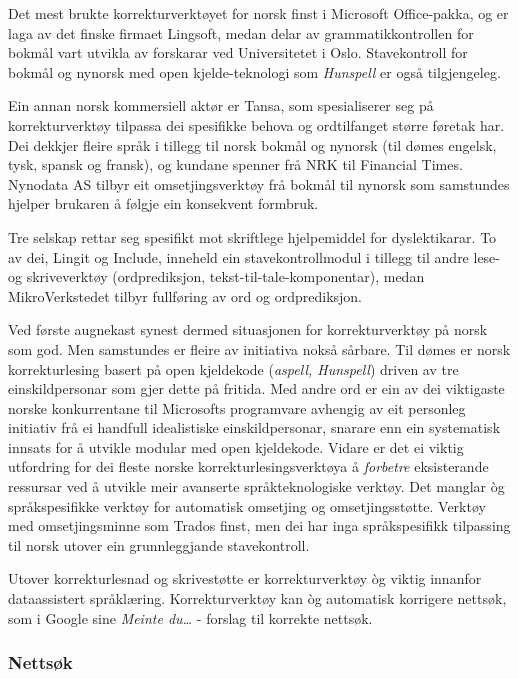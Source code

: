 \begin{multicols}{2}
Det mest brukte korrekturverktøyet for norsk finst i Microsoft Office-pakka, og er laga av det finske firmaet Lingsoft, medan delar av grammatikkontrollen for bokmål vart utvikla av forskarar ved Universitetet i Oslo. Stavekontroll for bokmål og nynorsk med open kjelde-teknologi som \textit{Hunspell} er også tilgjengeleg. 

Ein annan norsk kommersiell aktør er Tansa, som spesialiserer seg på korrekturverktøy tilpassa dei spesifikke behova og ordtilfanget større føretak har. 
Dei dekkjer fleire språk i tillegg til norsk bokmål og nynorsk (til dømes engelsk, tysk, spansk og fransk), og kundane spenner frå NRK til Financial Times. 
Nynodata AS tilbyr eit omsetjingsverktøy frå bokmål til nynorsk som samstundes hjelper brukaren å følgje ein konsekvent formbruk. 

Tre selskap rettar seg spesifikt mot skriftlege hjelpemiddel for dyslektikarar. To av dei, Lingit og Include, inneheld ein stavekontrollmodul i tillegg til andre lese- og skriveverktøy (ordprediksjon, tekst-til-tale-komponentar), medan MikroVerkstedet tilbyr fullføring av ord og ordprediksjon. 

Ved første augnekast synest dermed situasjonen for korrekturverktøy på norsk som god. 
Men samstundes er fleire av initiativa nokså sårbare. 
Til dømes er norsk korrekturlesing basert på open kjeldekode (\textit{aspell, Hunspell}) driven av tre einskildpersonar som gjer dette på fritida. 
Med andre ord er ein av dei viktigaste norske konkurrentane til Microsofts programvare avhengig av eit personleg initiativ frå ei handfull idealistiske einskildpersonar, snarare enn ein systematisk innsats for å utvikle modular med open kjeldekode. 
Vidare er det ei viktig utfordring for dei fleste norske korrekturlesingsverktøya å \textit{forbetre} eksisterande ressursar ved å utvikle meir avanserte språkteknologiske verktøy. Det manglar òg språkspesifikke verktøy for automatisk omsetjing og omsetjingsstøtte. Verktøy med omsetjingsminne som Trados finst, men dei har inga språkspesifikk tilpassing til norsk utover ein grunnleggjande stavekontroll. 

Utover korrekturlesnad og skrivestøtte er korrekturverktøy òg viktig innanfor dataassistert språklæring. Korrekturverktøy kan òg automatisk korrigere nettsøk, som i Google sine \textit{Meinte du…}  - forslag til korrekte nettsøk.

\subsubsection{Nettsøk}


\end{multicols}
